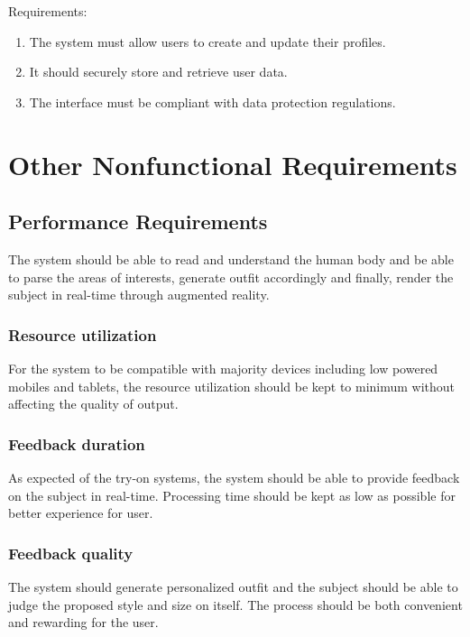 			Requirements:
			\begin{enumerate}
				\item The system must allow users to create and update their profiles.
				\item It should securely store and retrieve user data.
				\item The interface must be compliant with data protection regulations.
			\end{enumerate}

\section{Other Nonfunctional Requirements}
	\subsection{Performance Requirements}
		The system should be able to read and understand the human body and be able to parse the areas of interests, generate outfit accordingly and finally, render the subject in real-time through augmented reality.
		
		\subsubsection{Resource utilization}
			For the system to be compatible with majority devices including low powered mobiles and tablets, the resource utilization should be kept to minimum without affecting the quality of output.

		\subsubsection{Feedback duration}
			As expected of the try-on systems, the system should be able to provide feedback on the subject in real-time. Processing time should be kept as low as possible for better experience for user.

		\subsubsection{Feedback quality}
			The system should generate personalized outfit and the subject should be able to judge the proposed style and size on itself. The process should be both convenient and rewarding for the user.
		
